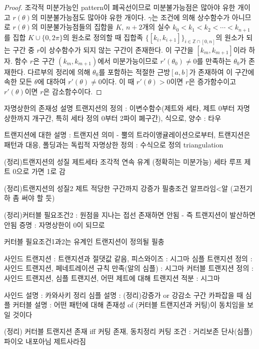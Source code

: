 \documentclass{amsart}
\theoremstyle{plain}
\theoremstyle{definition}
\theoremstyle{remark}
\begin{document}
\begin{proof}
조각적 미분가능인 pattern이 폐곡선이므로 미분불가능점은 많아야 유한 개이고 $r(\theta)$의 미분불가능점도 많아야 유한 개이다.
$\gamma$는 조건에 의해 상수함수가 아니므로 $r(\theta)$의 미분불가능점들의 집합을 $K$, $n+2$개의 실수 $k_0<k_1<k_2<\cdots<k_{n+1}$를 집합 $K\cup\{0,2\pi\}$의 원소로 정의할 때 집합족 $\{[k_i,k_{i+1}]\}_{i\in{\mathbb Z}\cap[0,n]}$의 원소가 되는 구간 중 $r$이 상수함수가 되지 않는 구간이 존재한다.
이 구간을 $[k_m, k_{m+1}]$이라 하자.
함수 $r$은 구간 $(k_m, k_{m+1})$에서 미분가능이므로 $r'(\theta_0)\ne0$를 만족하는 $\theta_0$가 존재한다.
다르부의 정리에 의해 $\theta_0$를 포함하는 적절한 근방$[a,b]$가 존재하여 이 구간에 속한 모든 $\theta$에 대하여 $r'(\theta)\ne0$이다.
이 때 $r'(\theta)>0$이면 $r$은 증가함수이고 $r'(\theta)$이면 $r$은 감소함수이다.
\end{proof}






\iffalse
자명상한의 존재성 설명
트랜지션의 정의 : 이변수함수(제트와 세타, 제트 0부터 자명상한까지 개구간, 특히 세타 정의 0부터 2파이 폐구간), 식으로, 양수 : 타우

트랜지션에 대한 설명 : 트랜지션 의미 - 뿔의 트라이앵귤레이션으로부터, 트랜지션은 패턴과 대응, 폴딩과는 독립적
자명상한 정의 : 수식으로 정의 triangulation

(정리)트랜지션의 성질
 제트세타 조각적 연속 유계 (정확히는 미분가능)
 세타 루프
 제트 0으로 가면 1로 감

(정리)트랜지션의 성질2
 제트 적당한 구간까지 강증가 필충조건 알프라임<알 (고전기하 좀 써야 할 듯)

(정리)커터블 필요조건2 : 원점을 지나는 접선 존재하면 안됨 - 즉 트랜지션이 발산하면 안됨
증명 : 자명상한이 0이 되므로

커터블 필요조건1과2는 유계인 트랜지션이 정의될 필충

사인드 트랜지션 : 트랜지션과 절댓값 같음, 피스와이즈 : 시그마
심플 트랜지션 정의 : 사인드 트랜지션, 페네트레이션 규칙 만족(알의 심플) : 시그마
커터블 트랜지션 정의 : 사인드 트랜지션, 심플 트랜지션, 어떤 제트에 대해 트랜지션 적분 : 시그마

사인드 설명 : 카와사키 정리
심플 설명 : (정리)강증가 or 강감소 구간 카파잡을 때 심플
커터블 설명 : 어떤 패턴에 대해 존재성 of (커터블 트랜지션과 커팅)이 동치임을 보일 것이다


(정리) 커터블 트랜지션 존재 iff 커팅 존재, 동치정리%
 커팅 조건 : 거리보존 단사(심플) 파이오 내포아님 제트사라짐
\end{document}
